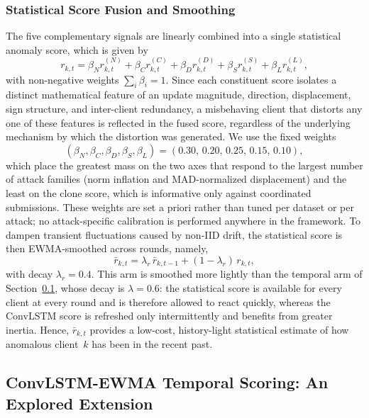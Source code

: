 \documentclass[journal]{IEEEtran}
\begin{document}
\subsubsection{Statistical Score Fusion and Smoothing}
The five complementary signals are linearly combined into a single statistical anomaly score, which is given by
\begin{equation}
r_{k,t} = \beta_N r_{k,t}^{(N)} + \beta_C r_{k,t}^{(C)} + \beta_D r_{k,t}^{(D)} + \beta_S r_{k,t}^{(S)} + \beta_L r_{k,t}^{(L)},
\label{eq:stat_score}
\end{equation}
with non-negative weights $\sum_i \beta_i = 1$. Since each constituent score isolates a distinct mathematical feature of an update magnitude, direction, displacement, sign structure, and inter-client redundancy, a misbehaving client that distorts any one of these features is reflected in the fused score, regardless of the underlying mechanism by which the distortion was generated. We use the fixed weights
\begin{equation}
(\beta_N, \beta_C, \beta_D, \beta_S, \beta_L) = (0.30,\, 0.20,\, 0.25,\, 0.15,\, 0.10),
\label{eq:beta_values}
\end{equation}
which place the greatest mass on the two axes that respond to the largest number of attack families (norm inflation and MAD-normalized displacement) and the least on the clone score, which is informative only against coordinated submissions. These weights are set a priori rather than tuned per dataset or per attack; no attack-specific calibration is performed anywhere in the framework. To dampen transient fluctuations caused by non-IID drift, the statistical score is then EWMA-smoothed across rounds, namely,
\begin{equation}
\bar r_{k,t} = \lambda_r\,\bar r_{k,t-1} + (1-\lambda_r)\,r_{k,t},
\label{eq:stat_ewma}
\end{equation}
with decay $\lambda_r = 0.4$. This arm is smoothed more lightly than the temporal arm of Section~\ref{sec:convlstm_ewma}, whose decay is $\lambda = 0.6$: the statistical score is available for every client at every round and is therefore allowed to react quickly, whereas the ConvLSTM score is refreshed only intermittently and benefits from greater inertia. Hence, $\bar r_{k,t}$ provides a low-cost, history-light statistical estimate of how anomalous client~$k$ has been in the recent past.

\subsection{ConvLSTM-EWMA Temporal Scoring: An Explored Extension}
\label{sec:convlstm_ewma}
\end{document}
